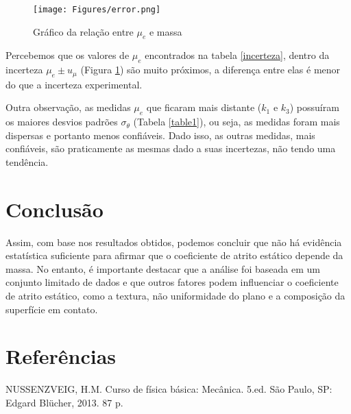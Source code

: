 \documentclass[12pt]{article}
\numberwithin{equation}{section} %
\begin{document}
\begin{figure}[H]
\centering
\texttt{[image: Figures/error.png]}
\caption{Gráfico da relação entre $\mu_{e}$ e massa}
\label{fig:graph}
\end{figure}
Percebemos que os valores de $\mu_{e}$ encontrados na tabela \ref{incerteza}, dentro da incerteza $ \mu_{e} \! \pm u_{\mu}$ (Figura \ref{fig:graph}) são muito próximos, a diferença entre elas é menor do que a incerteza experimental.

Outra observação, as medidas $\mu_{e}$  que ficaram mais distante ($k_{1}$ e $k_{3}$) possuíram os maiores desvios padrões $\sigma_{\theta}$ (Tabela \ref{table1}), ou seja, as medidas foram mais dispersas e portanto menos confiáveis. Dado isso, as outras medidas, mais confiáveis, são praticamente as mesmas dado a suas incertezas, não tendo uma tendência. 

\section{Conclusão}

Assim, com base nos resultados obtidos, podemos concluir que não há evidência estatística suficiente para afirmar que o coeficiente de atrito estático depende da massa. No entanto, é importante destacar que a análise foi baseada em um conjunto limitado de dados e que outros fatores podem influenciar o coeficiente de atrito estático, como a textura, não uniformidade do plano e a composição da superfície em contato.

\section{Referências}
NUSSENZVEIG, H.M. Curso de física básica: Mecânica. 5.ed. São Paulo, SP: Edgard Blücher,
2013. 87 p. 
\end{document}
